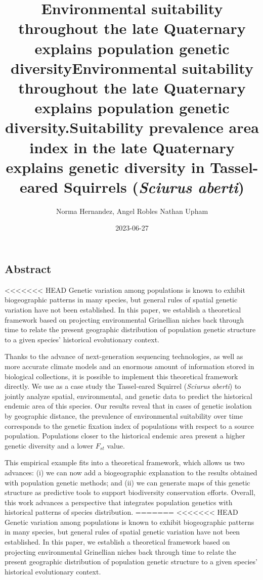 \documentclass[
]{article}
\title{Environmental suitability throughout the late Quaternary explains population genetic diversity}
\title{Environmental suitability throughout the late Quaternary explains
population genetic diversity.}
\title{Suitability prevalence area index in the late Quaternary explains genetic diversity in Tassel-eared Squirrels (\textit{Sciurus aberti})}
\author{Norma Hernandez, Angel Robles Nathan Upham}
\date{2023-06-27}
\begin{document}
\maketitle

\hypertarget{abstract}{%
\subsection{Abstract}\label{abstract}}

<<<<<<< HEAD
Genetic variation among populations is known to exhibit biogeographic patterns in many species, but general rules of spatial genetic variation have not been established. In this paper, we establish a theoretical framework based on projecting environmental Grinellian niches back through time to relate the present geographic distribution of population genetic structure to a given species' historical evolutionary context. 

Thanks to the advance of next-generation sequencing technologies, as well as more accurate climate models and an enormous amount of information stored in biological collections, it is possible to implement this theoretical framework directly. We use as a case study the Tassel-eared Squirrel (\textit{Sciurus aberti}) to jointly analyze spatial, environmental, and genetic data to predict the historical endemic area of this species. Our results reveal that in cases of genetic isolation by geographic distance, the prevalence of environmental suitability over time corresponds to the genetic fixation index of populations with respect to a source population. Populations closer to the historical endemic area present a higher genetic diversity and a lower \(F_{st}\) value.

This empirical example fits into a theoretical framework, which allows us two advances: (i) we can now add a biogeographic explanation to the results obtained with population genetic methods; and (ii) we can generate maps of this genetic structure as predictive tools to support biodiversity conservation efforts. Overall, this work advances a perspective that integrates population genetics with historical patterns of species distribution.
=======
<<<<<<< HEAD
Genetic variation among populations is known to exhibit biogeographic
patterns in many species, but general rules of spatial genetic variation
have not been established. In this paper, we establish a theoretical
framework based on projecting environmental Grinellian niches back
through time to relate the present geographic distribution of population
genetic structure to a given species' historical evolutionary context.
\end{document}
